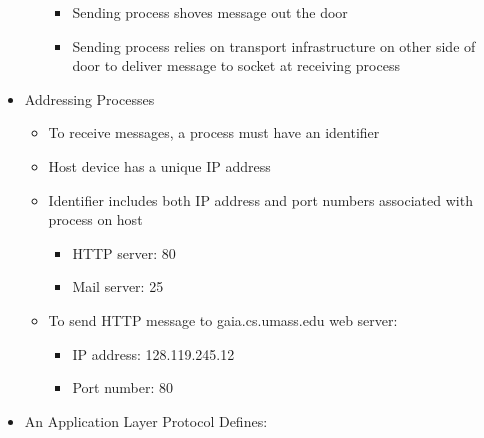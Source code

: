 \begin{itemize}
\begin{itemize}
        \begin{itemize}

          \item Sending process shoves message out the door

          \item Sending process relies on transport infrastructure on other side of door to deliver message to socket at receiving process

        \end{itemize}

    \end{itemize}

  \item Addressing Processes

    \begin{itemize}

      \item To receive messages, a process must have an identifier

      \item Host device has a unique IP address

      \item Identifier includes both IP address and port numbers associated with process on host

        \begin{itemize}

          \item HTTP server: 80

          \item Mail server: 25

        \end{itemize}

      \item To send HTTP message to gaia.cs.umass.edu web server:

        \begin{itemize}

          \item IP address: 128.119.245.12

          \item Port number: 80

        \end{itemize}

    \end{itemize}

  \item An Application Layer Protocol Defines:

    \begin{itemize}


\end{itemize}
\end{itemize}
